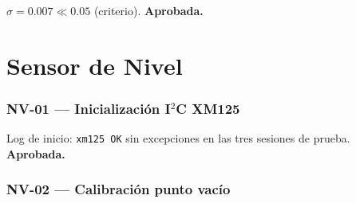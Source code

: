 \begin{table}[H]
\centering
\caption{Estabilidad del sensor en reposo (agua destilada estática).}
\label{tab:ph05}
\renewcommand{\arraystretch}{1.3}\small
{}
\end{table}

\noindent$\sigma = 0.007 \ll 0.05$ (criterio). \textbf{Aprobada.}

\section{Sensor de Nivel}

\subsubsection*{NV-01 --- Inicialización I$^2$C XM125}

Log de inicio: \texttt{xm125 OK} sin excepciones en las tres sesiones de prueba.
\textbf{Aprobada.}

\subsubsection*{NV-02 --- Calibración punto vacío}

\begin{table}[H]
\centering
\caption{Calibración del sensor en estado vacío.}
\label{tab:nv02}
\renewcommand{\arraystretch}{1.3}\small
{}
\end{table}

